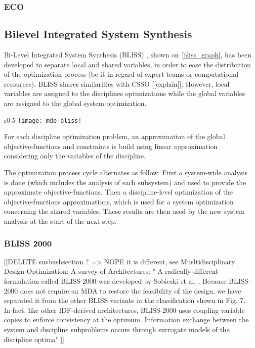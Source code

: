 \subsubsection{ECO}

\subsection{Bilevel Integrated System Synthesis}

Bi-Level Integrated System Synthesis (BLISS) \cite{J.:1998:BIS:886310}, shown on \figurename{} \ref{bliss_graph}, has been developed to separate local and shared variables, in order to ease the distribution of the optimization process (be it in regard of expert teams or computational resources).
BLISS shares similarities with CSSO [[explain]]. However, local variables are assigned to the disciplines optimizations while the global variables are assigned to the global system optimization.

\begin{wrapfigure}{r}{0.5\textwidth}
\centering
\texttt{[image: mdo\_bliss]}
\caption{BLISS method}\label{bliss_graph}
\end{wrapfigure}

For each discipline optimization problem, an approximation of the global objective-functions and constraints is build using linear approximation considering only the variables of the discipline.

The optimization process cycle alternates as follow: First a system-wide analysis is done (which includes the analysis of each subsystem) and used to provide the approximate objective-functions. Then a discipline-level optimization of the objective-functions approximations, which is used for a system optimization concerning the shared variables. These results are then used by the new system analysis at the start of the next step.

\subsubsection{BLISS 2000}
[[DELETE susbusbsection ? => NOPE it is different, see Musltidisciplinary Design Optimization: A survey of Architectures:
"    A radically different formulation called BLISS-2000 was developed by Sobieski et al; . Because BLISS-2000
does not require an MDA to restore the feasibility of the design, we have separated it from the other BLISS variants
in the classification shown in Fig. 7. In fact, like other IDF-derived architectures, BLISS-2000 uses coupling variable
copies to enforce consistency at the optimum. Information exchange between the system and discipline subproblems
occurs through surrogate models of the discipline optima"
]]
   
